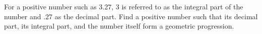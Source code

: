 For a positive number such as 3.27, 3 is referred to as the integral part of the number and .27 as the decimal part. Find a positive number such that its decimal part, its integral part, and the number itself form a geometric progression.